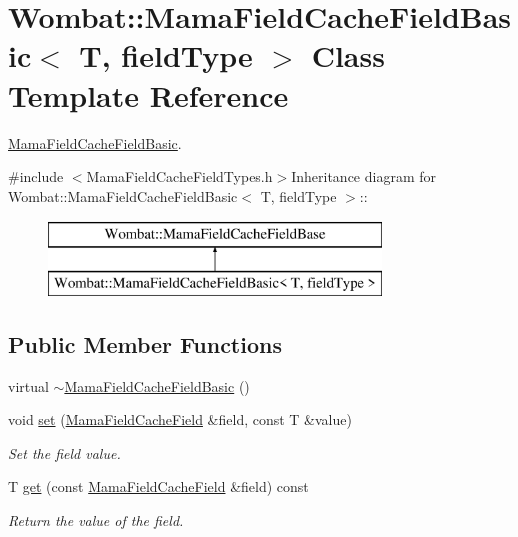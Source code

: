 \hypertarget{classWombat_1_1MamaFieldCacheFieldBasic}{
\section{Wombat::MamaFieldCacheFieldBasic$<$ T, fieldType $>$ Class Template Reference}
\label{classWombat_1_1MamaFieldCacheFieldBasic}
}


\hyperlink{classWombat_1_1MamaFieldCacheFieldBasic}{MamaFieldCacheFieldBasic}.  


{\ttfamily \#include $<$MamaFieldCacheFieldTypes.h$>$}Inheritance diagram for Wombat::MamaFieldCacheFieldBasic$<$ T, fieldType $>$::\begin{figure}[H]
\begin{center}
\leavevmode
\includegraphics[height=2cm]{classWombat_1_1MamaFieldCacheFieldBasic}
\end{center}
\end{figure}
\subsection*{Public Member Functions}
\begin{DoxyCompactItemize}
\item 
virtual \hyperlink{classWombat_1_1MamaFieldCacheFieldBasic_a9cfd91409fa496770949b2db3e0b4321}{$\sim$MamaFieldCacheFieldBasic} ()
\item 
void \hyperlink{classWombat_1_1MamaFieldCacheFieldBasic_a50c9816b799e79b30ea437e6bd24357a}{set} (\hyperlink{classWombat_1_1MamaFieldCacheField}{MamaFieldCacheField} \&field, const T \&value)
\begin{DoxyCompactList}\small\item\em Set the field value. \item\end{DoxyCompactList}\item 
T \hyperlink{classWombat_1_1MamaFieldCacheFieldBasic_a054d236ef9827c2b3278fb8b19bfde17}{get} (const \hyperlink{classWombat_1_1MamaFieldCacheField}{MamaFieldCacheField} \&field) const 
\begin{DoxyCompactList}\small\item\em Return the value of the field. \item\end{DoxyCompactList}\end{DoxyCompactItemize}
